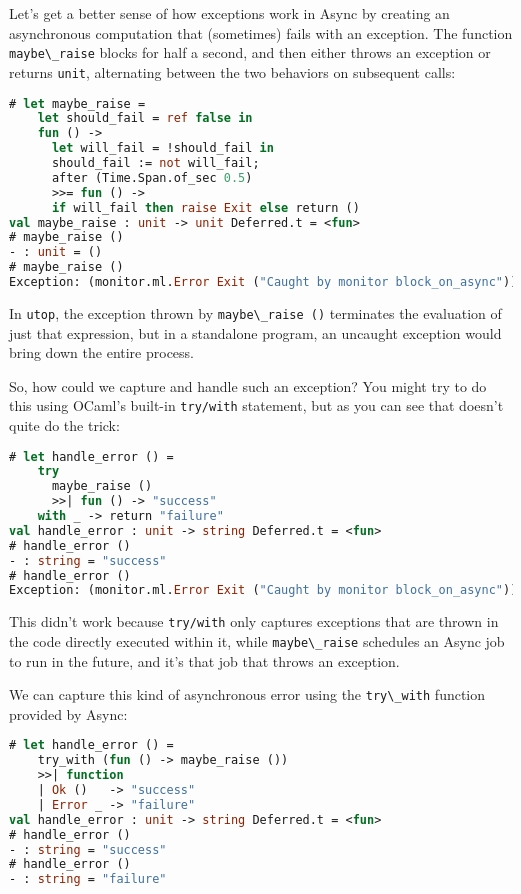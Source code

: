 Let's get a better sense of how exceptions work in Async by creating an
asynchronous computation that (sometimes) fails with an exception. The
function \passthrough{\lstinline!maybe\_raise!} blocks for half a
second, and then either throws an exception or returns
\passthrough{\lstinline!unit!}, alternating between the two behaviors on
subsequent calls:

\begin{lstlisting}[language=Caml]
# let maybe_raise =
    let should_fail = ref false in
    fun () ->
      let will_fail = !should_fail in
      should_fail := not will_fail;
      after (Time.Span.of_sec 0.5)
      >>= fun () ->
      if will_fail then raise Exit else return ()
val maybe_raise : unit -> unit Deferred.t = <fun>
# maybe_raise ()
- : unit = ()
# maybe_raise ()
Exception: (monitor.ml.Error Exit ("Caught by monitor block_on_async"))
\end{lstlisting}

In \passthrough{\lstinline!utop!}, the exception thrown by
\passthrough{\lstinline!maybe\_raise ()!} terminates the evaluation of
just that expression, but in a standalone program, an uncaught exception
would bring down the entire process.

So, how could we capture and handle such an exception? You might try to
do this using OCaml's built-in \passthrough{\lstinline!try/with!}
statement, but as you can see that doesn't quite do the trick:

\begin{lstlisting}[language=Caml]
# let handle_error () =
    try
      maybe_raise ()
      >>| fun () -> "success"
    with _ -> return "failure"
val handle_error : unit -> string Deferred.t = <fun>
# handle_error ()
- : string = "success"
# handle_error ()
Exception: (monitor.ml.Error Exit ("Caught by monitor block_on_async"))
\end{lstlisting}

This didn't work because \passthrough{\lstinline!try/with!} only
captures exceptions that are thrown in the code directly executed within
it, while \passthrough{\lstinline!maybe\_raise!} schedules an Async job
to run in the future, and it's that job that throws an exception.

We can capture this kind of asynchronous error using the
\passthrough{\lstinline!try\_with!} function provided by Async:

\begin{lstlisting}[language=Caml]
# let handle_error () =
    try_with (fun () -> maybe_raise ())
    >>| function
    | Ok ()   -> "success"
    | Error _ -> "failure"
val handle_error : unit -> string Deferred.t = <fun>
# handle_error ()
- : string = "success"
# handle_error ()
- : string = "failure"
\end{lstlisting}

